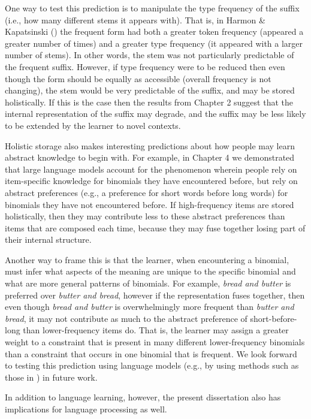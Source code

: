 \documentclass[
  12pt,
  letterpaper,
]{scrreport}
\begin{document}
One way to test this prediction is to manipulate the type frequency of
the suffix (i.e., how many different stems it appears with). That is, in
Harmon \& Kapatsinski ()
the frequent form had both a greater token frequency (appeared a greater
number of times) and a greater type frequency (it appeared with a larger
number of stems). In other words, the stem was not particularly
predictable of the frequent suffix. However, if type frequency were to
be reduced then even though the form should be equally as accessible
(overall frequency is not changing), the stem would be very predictable
of the suffix, and may be stored holistically. If this is the case then
the results from Chapter 2 suggest that the internal representation of
the suffix may degrade, and the suffix may be less likely to be extended
by the learner to novel contexts.

Holistic storage also makes interesting predictions about how people may
learn abstract knowledge to begin with. For example, in Chapter 4 we
demonstrated that large language models account for the phenomenon
wherein people rely on item-specific knowledge for binomials they have
encountered before, but rely on abstract preferences (e.g., a preference
for short words before long words) for binomials they have not
encountered before. If high-frequency items are stored holistically,
then they may contribute less to these abstract preferences than items
that are composed each time, because they may fuse together losing part
of their internal structure.

Another way to frame this is that the learner, when encountering a
binomial, must infer what aspects of the meaning are unique to the
specific binomial and what are more general patterns of binomials. For
example, \emph{bread and butter} is preferred over \emph{butter and
bread}, however if the representation fuses together, then even though
\emph{bread and butter} is overwhelmingly more frequent than
\emph{butter and bread}, it may not contribute as much to the abstract
preference of short-before-long than lower-frequency items do. That is,
the learner may assign a greater weight to a constraint that is present
in many different lower-frequency binomials than a constraint that
occurs in one binomial that is frequent. We look forward to testing this
prediction using language models (e.g., by using methods such as those
in )
in future work.

In addition to language learning, however, the present dissertation also
has implications for language processing as well.
\end{document}
